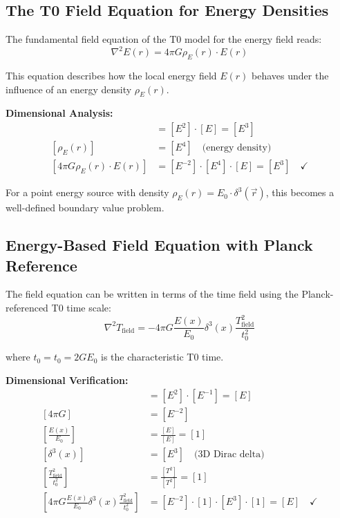 \documentclass[12pt,a4paper]{report}
\newcommand{\tzero}{t_0}                  %
\begin{document}
	\subsection{The T0 Field Equation for Energy Densities}\label{subsec:field_equation_energy}
	
	The fundamental field equation of the T0 model for the energy field reads:
	\begin{equation}
		\nabla^2 E(r) = 4\pi G \rho_E(r) \cdot E(r)
		\label{eq:t0_field_equation_energy}
	\end{equation}
	
	This equation describes how the local energy field $E(r)$ behaves under the influence of an energy density $\rho_E(r)$.
	
	\textbf{Dimensional Analysis:}
	\begin{align}
		[\nabla^2 E(r)] &= [E^2] \cdot [E] = [E^3] \\
		[\rho_E(r)] &= [E^4] \quad \text{(energy density)} \\
		[4\pi G \rho_E(r) \cdot E(r)] &= [E^{-2}] \cdot [E^4] \cdot [E] = [E^3] \quad \checkmark
	\end{align}
	
	For a point energy source with density $\rho_E(r) = E_0 \cdot \delta^3(\vec{r})$, this becomes a well-defined boundary value problem.
	
	\subsection{Energy-Based Field Equation with Planck Reference}\label{subsec:energy_field_equation_corrected}
	
	The field equation can be written in terms of the time field using the Planck-referenced T0 time scale:
	\begin{equation}
		\boxed{\nabla^2 T_{\text{field}} = -4\pi G \frac{E(x)}{E_0} \delta^3(x) \frac{T_{\text{field}}^2}{t_0^2}}
		\label{eq:field_equation_energy_based}
	\end{equation}
	
	where $t_0 = \tzero = 2GE_0$ is the characteristic T0 time.
	
	\textbf{Dimensional Verification:}
	\begin{align}
		[\nabla^2 T_{\text{field}}] &= [E^2] \cdot [E^{-1}] = [E] \\
		[4\pi G] &= [E^{-2}] \\
		\left[\frac{E(x)}{E_0}\right] &= \frac{[E]}{[E]} = [1] \\
		[\delta^3(x)] &= [E^3] \quad \text{(3D Dirac delta)} \\
		\left[\frac{T_{\text{field}}^2}{t_0^2}\right] &= \frac{[T^2]}{[T^2]} = [1] \\
		\left[4\pi G \frac{E(x)}{E_0} \delta^3(x) \frac{T_{\text{field}}^2}{t_0^2}\right] &= [E^{-2}] \cdot [1] \cdot [E^3] \cdot [1] = [E] \quad \checkmark
	\end{align}
	
\end{document}
